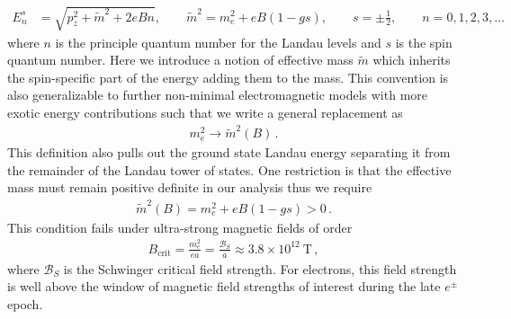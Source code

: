 \documentclass[universe,article,submit,moreauthors,pdftex,a4paper]{Definitions/mdpi}
\begin{document}
\begin{align}
 \label{KGPEnergy} E_{n}^{s}&=\sqrt{p^2_z+\tilde{m}^2+2eBn},\qquad\tilde{m}^2=m^2_e+eB\left(1-gs\right),\qquad s=\pm\frac{1}{2},\qquad n=0,1,2,3,\dots
\end{align}
where $n$ is the principle quantum number for the Landau levels and $s$ is the spin quantum number. Here we introduce a notion of effective mass $\tilde{m}$ which inherits the spin-specific part of the energy adding them to the mass. This convention is also generalizable to further non-minimal electromagnetic models with more exotic energy contributions such that we write a general replacement as
\begin{align}
 \label{MagMass} m_{e}^{2}\rightarrow\tilde{m}^2(B)\,.
\end{align}
This definition also pulls out the ground state Landau energy separating it from the remainder of the Landau tower of states. One restriction is that the effective mass must remain positive definite in our analysis thus we require
\begin{align}
 \label{MassLimit} \tilde{m}^2(B)=m^2_e+eB\left(1-gs\right)>0\,.
\end{align}
This condition fails under ultra-strong magnetic fields of order
\begin{align}
 \label{MagMassFail} B_{\mathrm{crit}}=\frac{m_{e}^{2}}{ea}=\frac{\mathcal{B}_{S}}{a}\approx3.8\times10^{12}\ \mathrm{T}\,,
\end{align}
where $\mathcal{B}_{S}$ is the Schwinger critical field strength. For electrons, this field strength is well above the window of magnetic field strengths of interest during the late $e^{\pm}$ epoch.

\end{document}
